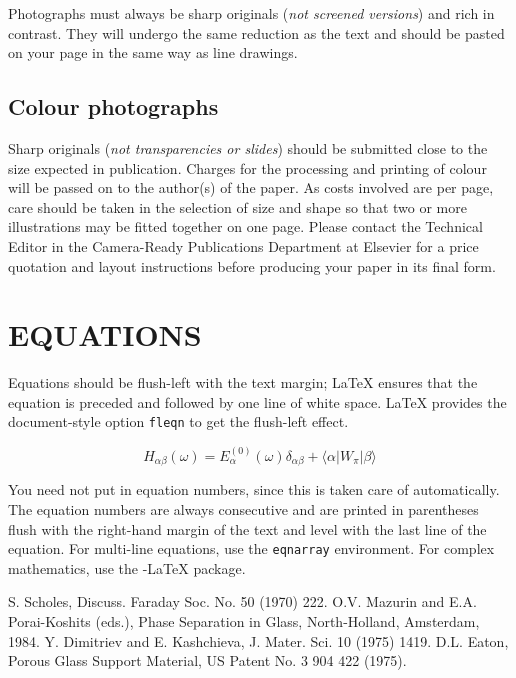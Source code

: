 Photographs must always be sharp originals ({\em not screened
versions\/}) and rich in contrast. They will undergo the same reduction
as the text and should be pasted on your page in the same way as line
drawings.

\subsection{Colour photographs}

Sharp originals ({\em not transparencies or slides\/}) should be
submitted close to the size expected in publication. Charges for the
processing and printing of colour will be passed on to the author(s) of
the paper. As costs involved are per page, care should be taken in the
selection of size and shape so that two or more illustrations may be
fitted together on one page. Please contact the Technical Editor in the
Camera-Ready Publications Department at Elsevier for a price quotation
and layout instructions before producing your paper in its final form.

\section{EQUATIONS}

Equations should be flush-left with the text margin; \LaTeX{} ensures
that the equation is preceded and followed by one line of white space. 
\LaTeX{} provides the document-style option {\tt fleqn} to get the
flush-left effect.

\begin{equation}
H_{\alpha\beta}(\omega) = E_\alpha^{(0)}(\omega) \delta_{\alpha\beta} +
                          \langle \alpha | W_\pi | \beta \rangle 
\end{equation}

You need not put in equation numbers, since this is taken care of
automatically. The equation numbers are always consecutive and are
printed in parentheses flush with the right-hand margin of the text and
level with the last line of the equation. For multi-line equations, use
the {\tt eqnarray} environment. For complex mathematics, use the
\AmS-\LaTeX{} package.

\begin{thebibliography}{9}
 S. Scholes, Discuss. Faraday Soc. No. 50 (1970) 222.
 O.V. Mazurin and E.A. Porai-Koshits (eds.),
                 Phase Separation in Glass, North-Holland, Amsterdam, 1984.
 Y. Dimitriev and E. Kashchieva, 
                 J. Mater. Sci. 10 (1975) 1419.
 D.L. Eaton, Porous Glass Support Material,
                 US Patent No. 3 904 422 (1975).
\end{thebibliography}

